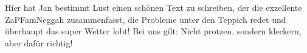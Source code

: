 
Hier hat Jan bestimmt Lust einen schönen Text zu schreiben, der die exzellente ZaPFamNeggah zusammenfasst,
die Probleme unter den Teppich redet und überhaupt das super Wetter lobt!
Bei uns gilt: Nicht protzen, sondern kleckern, aber dafür richtig!
